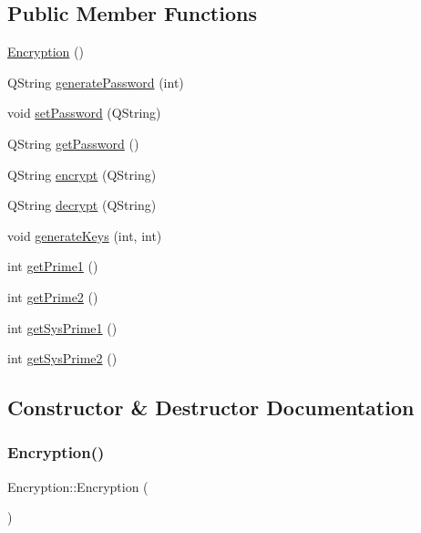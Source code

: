 \subsection*{Public Member Functions}
\begin{DoxyCompactItemize}
\item 
\hyperlink{class_encryption_a705103f49108e659248ba0f9b4af8c00}{Encryption} ()
\item 
Q\+String \hyperlink{class_encryption_a4e2cab5c9d5349f085d40c8373b1985b}{generate\+Password} (int)
\item 
void \hyperlink{class_encryption_a8ddf113b231bf2f60d5714cdf0d07857}{set\+Password} (Q\+String)
\item 
Q\+String \hyperlink{class_encryption_a55e34ee5668779c478f5771d24c2b183}{get\+Password} ()
\item 
Q\+String \hyperlink{class_encryption_a764237662a4daa19502e6454126fa279}{encrypt} (Q\+String)
\item 
Q\+String \hyperlink{class_encryption_aa52a864985f89af118c61a4a3173fd72}{decrypt} (Q\+String)
\item 
void \hyperlink{class_encryption_a737b60a95e826d7a99a3a3f62c9889d2}{generate\+Keys} (int, int)
\item 
int \hyperlink{class_encryption_af133b980f6daf0548a7097623ed35b10}{get\+Prime1} ()
\item 
int \hyperlink{class_encryption_ab4089ae7185f6c10fcea6b6d697872c2}{get\+Prime2} ()
\item 
int \hyperlink{class_encryption_ab182872a04d40023eebb199abfe81896}{get\+Sys\+Prime1} ()
\item 
int \hyperlink{class_encryption_a4a18c3b332487ec393c3ddf06c39c48f}{get\+Sys\+Prime2} ()
\end{DoxyCompactItemize}


\subsection{Constructor \& Destructor Documentation}
\hypertarget{class_encryption_a705103f49108e659248ba0f9b4af8c00}{}\label{class_encryption_a705103f49108e659248ba0f9b4af8c00} 
\subsubsection{\texorpdfstring{Encryption()}{Encryption()}}
{\footnotesize\ttfamily Encryption\+::\+Encryption (\begin{DoxyParamCaption}{ }\end{DoxyParamCaption})}




